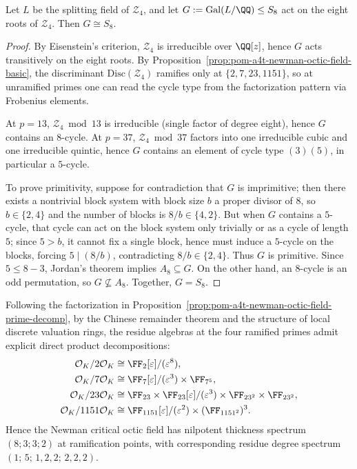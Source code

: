 \begin{proposition}\label{prop:pom-a4t-newman-octic-field-galois-s8}
Let \(L\) be the splitting field of \(\mathcal Z_4\), and let \(G:=\mathrm{Gal}(L/\QQ)\le S_8\) act on the eight roots of \(\mathcal Z_4\).
Then \(G\cong S_8\).
\end{proposition}
\begin{proof}
By Eisenstein's criterion, \(\mathcal Z_4\) is irreducible over \(\QQ[z]\), hence \(G\) acts transitively on the eight roots.
By Proposition~\ref{prop:pom-a4t-newman-octic-field-basic}, the discriminant \(\mathrm{Disc}(\mathcal Z_4)\) ramifies only at \(\{2,7,23,1151\}\), so at unramified primes one can read the cycle type from the factorization pattern via Frobenius elements.
\par
At \(p=13\), \(\mathcal Z_4\bmod 13\) is irreducible (single factor of degree eight), hence \(G\) contains an \(8\)-cycle.
At \(p=37\), \(\mathcal Z_4\bmod 37\) factors into one irreducible cubic and one irreducible quintic, hence \(G\) contains an element of cycle type \((3)(5)\), in particular a \(5\)-cycle.
\par
To prove primitivity, suppose for contradiction that \(G\) is imprimitive; then there exists a nontrivial block system with block size \(b\) a proper divisor of \(8\), so \(b\in\{2,4\}\) and the number of blocks is \(8/b\in\{4,2\}\).
But when \(G\) contains a \(5\)-cycle, that cycle can act on the block system only trivially or as a cycle of length \(5\); since \(5>b\), it cannot fix a single block, hence must induce a \(5\)-cycle on the blocks, forcing \(5\mid (8/b)\), contradicting \(8/b\in\{2,4\}\).
Thus \(G\) is primitive.
Since \(5\le 8-3\), Jordan's theorem implies \(A_8\subseteq G\).
On the other hand, an \(8\)-cycle is an odd permutation, so \(G\not\subseteq A_8\).
Together, \(G=S_8\).
\end{proof}

\begin{corollary}\label{cor:pom-a4t-newman-octic-field-residue-algebra}
Following the factorization in Proposition~\ref{prop:pom-a4t-newman-octic-field-prime-decomp}, by the Chinese remainder theorem and the structure of local discrete valuation rings, the residue algebras at the four ramified primes admit explicit direct product decompositions:
\begin{align*}
\mathcal O_K/2\mathcal O_K &\cong \FF_2[\varepsilon]/(\varepsilon^8),\\
\mathcal O_K/7\mathcal O_K &\cong \FF_7[\varepsilon]/(\varepsilon^3)\times \FF_{7^5},\\
\mathcal O_K/23\mathcal O_K &\cong \FF_{23}\times \FF_{23}[\varepsilon]/(\varepsilon^3)\times \FF_{23^2}\times \FF_{23^2},\\
\mathcal O_K/1151\mathcal O_K &\cong \FF_{1151}[\varepsilon]/(\varepsilon^2)\times (\FF_{1151^2})^{3}.
\end{align*}
Hence the Newman critical octic field has nilpotent thickness spectrum \((8;3;3;2)\) at ramification points, with corresponding residue degree spectrum \((1;\,5;\,1,2,2;\,2,2,2)\).
\end{corollary}

